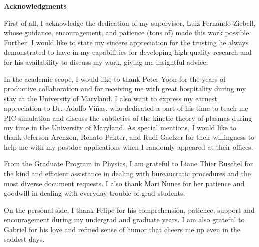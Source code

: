 \newpage
\pagestyle{empty}
\begin{center}
  \textbf{\large Acknowledgments}
\end{center}
  
First of all, I acknowledge the dedication of my supervisor, Luiz Fernando
Ziebell, whose guidance, encouragement, and patience (tons of) made this
work possible. Further, I would like to state my sincere appreciation for
the trusting he always demonstrated to have in my capabilities for developing
high-quality research and for his availability to discuss my work, giving me
insightful advice. %

In the academic scope, I would like to thank Peter Yoon for the years of
productive collaboration and for receiving me with great hospitality during
my stay at the University of Maryland.
I also want to
express my earnest appreciation to Dr.~Adolfo Viñas, who dedicated a part of
his time to teach me PIC simulation and discuss the subtleties of the kinetic
theory of plasmas during my time in the University of Maryland.
As special
mentions, I would like to thank Jeferson Arenzon, Renato Pakter, and Rudi
Gaelzer for their willingness to help me with my postdoc applications when I
randomly appeared at their offices.

From the Graduate Program in Physics, I am grateful to Liane Thier Ruschel for
the kind and efficient assistance in dealing with bureaucratic procedures and
the most diverse document requests. I also thank Mari Nunes for her patience
and goodwill in dealing with everyday trouble of grad students.

On the personal side, I thank Felipe for his comprehension, patience, support
and encouragement during my undergrad and graduate years. I am also grateful
to Gabriel for his love and refined sense of humor that cheers me up even in
the saddest days.

